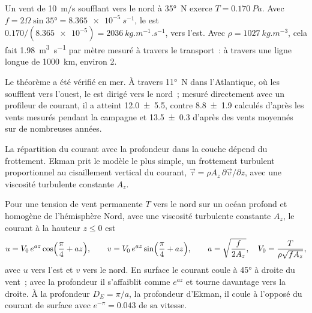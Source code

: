 \begin{example}\label{ex:b1:ocean-circulation:transport}
Un vent de \qty{10}{m/s} soufflant vers le nord à \ang{35}~N exerce
$T = \qty{0.170}{Pa}$. Avec $f = 2\Omega\sin\ang{35} = \qty{8.365e-5}{s^{-1}}$, le
 est $0.170/(\num{8.365e-5}) = \qty{2036}{kg.m^{-1}.s^{-1}}$, vers
l'est. Avec $\rho = \qty{1027}{kg.m^{-3}}$, cela fait \qty{1.98}{m^3.s^{-1}} par
mètre mesuré à travers le transport~: à travers une ligne longue de \qty{1000}{km}, environ
\qty{2}{\sverdrup}.
\end{example}

Le théorème a été vérifié en mer. À travers \ang{11}~N dans l'Atlantique, où les
 soufflent vers l'ouest, le  est dirigé vers le nord~; mesuré
directement avec un profileur de courant, il a atteint
\qty[uncertainty-mode=separate]{12.0 \pm 5.5}{\sverdrup}, contre
\qty[uncertainty-mode=separate]{8.8 \pm 1.9}{\sverdrup} calculés d'après les vents
mesurés pendant la campagne et
\qty[uncertainty-mode=separate]{13.5 \pm 0.3}{\sverdrup} d'après des vents moyennés sur
de nombreuses années.

La répartition du courant avec la profondeur dans la couche dépend du
frottement. Ekman prit le modèle le plus simple, un frottement turbulent proportionnel au
cisaillement vertical du courant, $\vec\tau = \rho A_z\,\partial\vec v/\partial z$, avec
une viscosité turbulente constante $A_z$.

\begin{proposition}\label{prop:b1:ocean-circulation:spiral}
Pour une tension de vent permanente $T$ vers le nord sur un océan profond et homogène de
l'hémisphère Nord, avec une viscosité turbulente constante $A_z$, le courant à la hauteur $z
\leq 0$ est
\[
  u = V_0\,e^{az}\cos\Bigl(\frac\pi4 + az\Bigr),\qquad
  v = V_0\,e^{az}\sin\Bigl(\frac\pi4 + az\Bigr),\qquad
  a = \sqrt{\frac{f}{2A_z}},\quad V_0 = \frac{T}{\rho\sqrt{fA_z}},
\]
avec $u$ vers l'est et $v$ vers le nord. En surface le courant coule à \ang{45} à
droite du vent~; avec la profondeur il s'affaiblit comme $e^{az}$ et tourne davantage vers la
droite. À la profondeur $D_E = \pi/a$, la profondeur d'Ekman, il coule à l'opposé du courant de
surface avec $e^{-\pi} = \num{0.043}$ de sa vitesse.
\end{proposition}
\admitted

